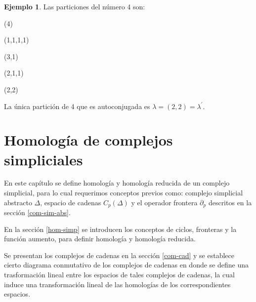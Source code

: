 \documentclass[12pt]{book}
\theoremstyle{definition}
\newtheorem{example}[theorem]{Ejemplo}
\newcounter{in}
\newcounter{ini}
\begin{document}
\begin{example}Las particiones del número 4 son:
  \begin{center}
    \begin{minipage}[h]{0.2\linewidth}
      \centering {}

      (4)
    \end{minipage}
    \begin{minipage}[h]{0.15\linewidth}
      \centering {}

      (1,1,1,1)
    \end{minipage}
    \begin{minipage}[h]{0.2\linewidth}
      \centering {}
      
      (3,1)
    \end{minipage}
    \begin{minipage}[h]{0.2\linewidth}
      \centering {}
      
      (2,1,1)
    \end{minipage}
    \begin{minipage}[h]{0.2\linewidth}
      \centering {}
      
      (2,2)
    \end{minipage}
  \end{center}
 La única partición de 4 que es autoconjugada es $\lambda=(2,2)=\lambda^{'}$.
\end{example}

\chapter{Homología de complejos simpliciales}
\label{cha:hom-com-sim}

En este capítulo se define homología  y homología reducida de un
complejo simplicial, para lo cual requerimos conceptos previos como:
complejo simplicial abstracto $\Delta$, espacio de cadenas $C_{p}(\Delta)$ y el
operador frontera $\partial_{p}$ descritos en la sección
\ref{com-sim-abs}. 

En la sección \ref{hom-simp} se introducen los conceptos de ciclos, fronteras y la
función aumento, para definir homología y homología reducida.

Se presentan los complejos de cadenas en la sección \ref{com-cad} y se
establece cierto diagrama conmutativo de los complejos de cadenas en donde
se define una trasformación lineal entre los espacios de tales
complejos de cadenas, la cual induce una transformación lineal de las homologías
de los correspondientes espacios.
\end{document}
